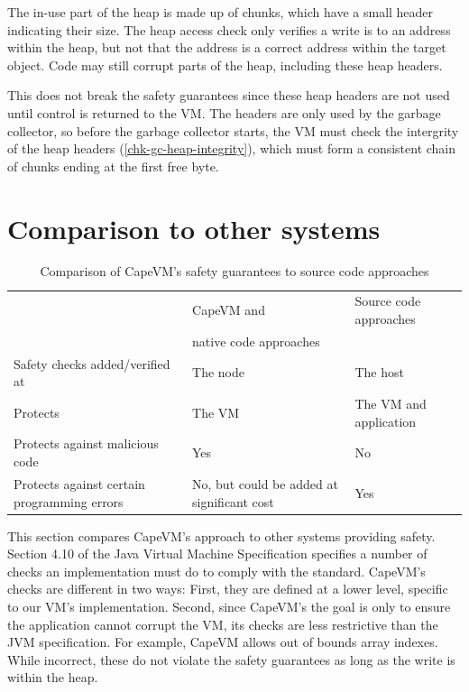 The in-use part of the heap is made up of chunks, which have a small header indicating their size. The heap access check only verifies a write is to an address within the heap, but not that the address is a correct address within the target object. Code may still corrupt parts of the heap, including these heap headers.

This does not break the safety guarantees since these heap headers are not used until control is returned to the VM. The headers are only used by the garbage collector, so before the garbage collector starts, the VM must check the intergrity of the heap headers (\ref{chk-gc-heap-integrity}), which must form a consistent chain of chunks ending at the first free byte.



\section{Comparison to other systems}

\begin{table}
\caption{Comparison of CapeVM's safety guarantees to source code approaches}
\label{tbl-safety-comparison-source-code-approaches}
    \begin{tabular}{p{}p{}p{}} %
    \toprule
                                                & CapeVM and                                  & Source code approaches \\
                                                & native code approaches                      & \\
    \midrule
    \midrule
    Safety checks added/verified at             & The node                                    & The host \\
    Protects                                    & The VM                                      & The VM and application \\
    Protects against malicious code             & Yes                                         & No \\
    Protects against certain programming errors & No, but could be added at significant cost  & Yes \\
    \bottomrule
    \end{tabular}
\end{table}

This section compares CapeVM's approach to other systems providing safety. Section 4.10 of the Java Virtual Machine Specification \cite{Lindholm:2017vu} specifies a number of checks an implementation must do to comply with the standard. CapeVM's checks are different in two ways: First, they are defined at a lower level, specific to our VM's implementation. Second, since CapeVM's the goal is only to ensure the application cannot corrupt the VM, its checks are less restrictive than the JVM specification. For example, CapeVM allows out of bounds array indexes. While incorrect, these do not violate the safety guarantees as long as the write is within the heap.

